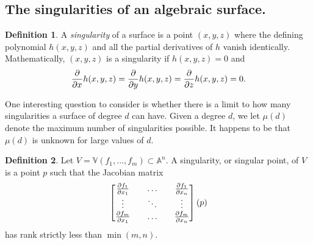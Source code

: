 \documentclass[a4paper]{article}
\theoremstyle{definition}
\newtheorem{defn}{Definition}
\theoremstyle{plain}
\newcommand{\V}{\ensuremath{\mathbb{V}}}
\renewcommand{\A}{\ensuremath{\mathbb{A}}}
\begin{document}
    \subsection{The singularities of an algebraic surface.}
    \label{sub:the_singularities_of_an_algebraic_surface_}
    
    \begin{defn}
        A \emph{singularity} of a surface is a point $(x, y, z)$ where the defining
        polynomial $h(x, y, z)$ and all the partial derivatives of $h$ vanish
        identically. Mathematically, $(x, y, z)$ is a singularity if $h(x, y, z) =
        0$ and
        \begin{align*}
            \notag
            \frac{\partial}{\partial x} h(x, y, z) = \frac{\partial}{\partial
            y} h(x, y, z) = \frac{\partial}{\partial z} h(x, y, z) = 0.
        \end{align*}
    \end{defn}
    One interesting question to consider is whether there is a limit to how
    many singularities a surface of degree $d$ can have. Given a degree $d$, we
    let $\mu(d)$ denote the maximum number of singularities possible. It
    happens to be that $\mu(d)$ is unknown for large values of $d$. 
    
    \begin{defn}
        Let $V = \V(f_1, ..., f_m) \subset \A^n$. A singularity, or singular point, of $V$ is a point $p$ such that
        the Jacobian matrix
        \begin{equation}
            \notag
            \begin{bmatrix}
                \frac{\partial f_1}{\partial x_1} && \ldots && \frac{\partial f_1}{\partial x_n} \\
                \vdots && \ddots && \vdots \\
                \frac{\partial f_m}{\partial x_1} && \ldots && \frac{\partial f_m}{\partial x_n} \\
            \end{bmatrix} \left( p \right)
        \end{equation}
        has rank strictly less than $\min(m, n)$.
    \end{defn}
    \clearpage
    \printbibliography
\end{document}
